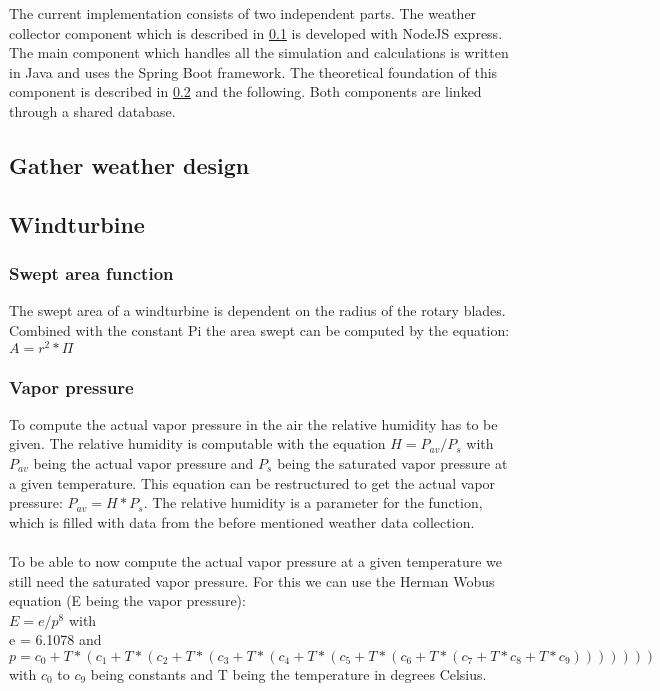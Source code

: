 The current implementation consists of two independent parts. The weather collector component which is described in \cref{subsec:weather} is developed with  NodeJS express. The main component which handles all the simulation and calculations is written in Java and uses the Spring Boot framework. The theoretical foundation of this component is described in \cref{subsec:Windturbine} and the following. Both components are linked through a shared database.

\subsection{Gather weather design}\label{subsec:weather}


\subsection{Windturbine}\label{subsec:Windturbine}
\subsubsection{Swept area function}
The swept area of a windturbine is dependent on the radius of the rotary blades. Combined with the constant Pi the area swept can be computed by the equation\cite{Beckmann}: $A = r^{2}* \Pi  $
\subsubsection{Vapor pressure}
To compute the actual vapor pressure in the air the relative humidity has to be given. The relative humidity is computable with the equation $H = P_{av} / P_s$ with $P_{av}$ being the actual vapor pressure and $P_s$ being the saturated vapor pressure at a given temperature. This equation can be restructured to get the actual vapor pressure: $P_{av}  = H * P_s$. The relative humidity is a parameter for the function, which is filled with data from the before mentioned weather data collection.\\
\\
To be able to now compute the actual vapor pressure at a given temperature we still need the saturated vapor pressure. For this we can use the Herman Wobus equation (E being the vapor pressure):\\
$E = e/p^{8}$ with\\
e = 6.1078 and\\
$p = c_0 + T * (c_1 + T * (c_2 + T * (c_3 + T * (c_4 + T *(c_5 + T * (c_6 + T * (c_7 + T * c_8 + T * c_9)))))))$\\
with $c_0$ to $c_9$ being constants and T being the temperature in degrees Celsius.\cite{AirDensity,NOAA}

